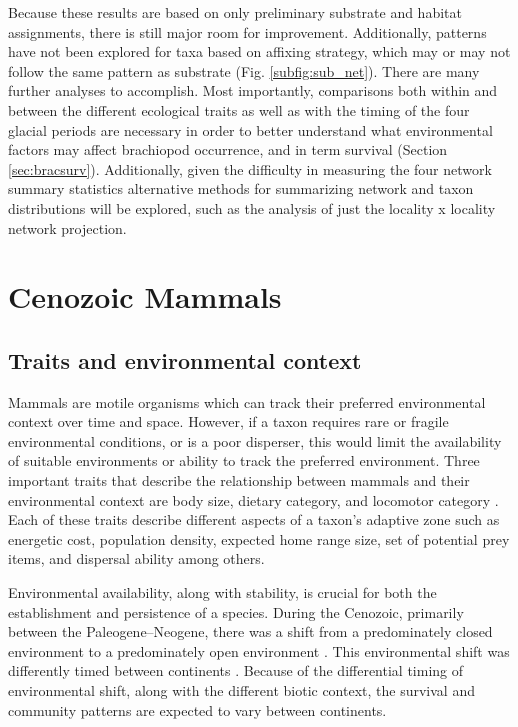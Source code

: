 \documentclass[12pt,letterpaper]{article}
\begin{document}
Because these results are based on only preliminary substrate and habitat assignments, there is still major room for improvement. Additionally, patterns have not been explored for taxa based on affixing strategy, which may or may not follow the same pattern as substrate (Fig. \ref{subfig:sub_net}). There are many further analyses to accomplish. Most importantly, comparisons both within and between the different ecological traits as well as with the timing of the four glacial periods are necessary in order to better understand what environmental factors may affect brachiopod occurrence, and in term survival (Section \ref{sec:bracsurv}). Additionally, given the difficulty in measuring the four network summary statistics alternative methods for summarizing network and taxon distributions will be explored, such as the analysis of just the locality x locality network projection.

\clearpage

\section{Cenozoic Mammals} \label{sec:mam}
\subsection{Traits and environmental context} \label{sec:mamback}
Mammals are motile organisms which can track their preferred environmental context over time and space. However, if a taxon requires rare or fragile environmental conditions, or is a poor disperser, this would limit the availability of suitable environments or ability to track the preferred environment. Three important traits that describe the relationship between mammals and their environmental context are body size, dietary category, and locomotor category \citep{Smith2004,Smith2008b,Damuth1981a,Damuth1979,Jernvall2004,Lyons2005,Lyons2010}. Each of these traits describe different aspects of a taxon's adaptive zone such as energetic cost, population density, expected home range size, set of potential prey items, and dispersal ability among others. 

Environmental availability, along with stability, is crucial for both the establishment and persistence of a species. During the Cenozoic, primarily between the Paleogene--Neogene, there was a shift from a predominately closed environment to a predominately open environment \citep{Janis1993a,Blois2009,Rose2006}. This environmental shift was differently timed between continents \citep{Stromberg2005,Stromberg2013}. Because of the differential timing of environmental shift, along with the different biotic context, the survival and community patterns are expected to vary between continents.
\end{document}
